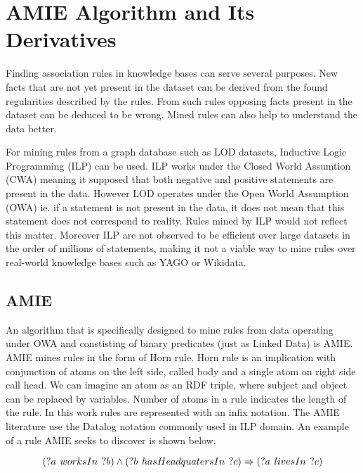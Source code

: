 \chapter{AMIE Algorithm and Its Derivatives\label{amieandits}}

Finding association rules in knowledge bases can serve several purposes. New facts that are not yet present in the dataset can be derived from the found regularities described by the rules. From such rules opposing facts present in the dataset can be deduced to be wrong. Mined rules can also help to understand the data better.

For mining rules from a graph database such as LOD datasets, Inductive Logic Programming (ILP) can be used. ILP works under the Closed World Assumtion (CWA) meaning it supposed that both negative and positive statements are present in the data. However LOD operates under the Open World Assumption (OWA) ie. if a statement is not present in the data, it does not mean that this statement does not correspond to reality. Rules mined by ILP would not reflect this matter. Moreover ILP are not observed to be efficient over large datasets in the order of millions of statements, making it not a viable way to mine rules over real-world knowledge bases such as YAGO or Wikidata.

\section{AMIE\label{amie}}

An algorithm that is specifically designed to mine rules from data operating under OWA and constisting of binary predicates (just as Linked Data) is AMIE.\cite{Galarraga2013} AMIE mines rules in the form of Horn rule. Horn rule is an implication with conjunction of atoms on the left side, called body and a single atom on right side call head. We can imagine an atom as an RDF triple, where subject and object can be replaced by variables. Number of atoms in a rule indicates the length of the rule. In this work rules are represented with an infix notation. The AMIE literature use the Datalog notation commonly used in ILP domain. An example of a rule AMIE seeks to discover is shown below. 

\label{asocRule}
$$
(?a\hspace{0.4em}worksIn\hspace{0.4em}?b) \land
(?b\hspace{0.4em}hasHeadquatersIn\hspace{0.4em}?c) \Rightarrow
(?a\hspace{0.4em}livesIn\hspace{0.4em}?c)
$$

